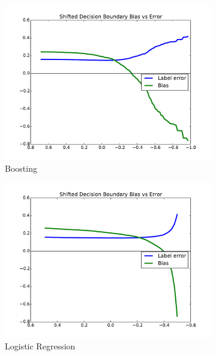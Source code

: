 \documentclass[conference]{IEEEtran}
\begin{document}
\begin{figure}[t]
\centering
\begin{subfigure}{.7\columnwidth}
\includegraphics[width=\columnwidth]{images/adult-boosting-T.pdf}%
\caption{Boosting}%
\label{fig:adult_boosting_tradeoff}%
\end{subfigure}%
\begin{subfigure}{.7\columnwidth}
\includegraphics[width=\columnwidth]{images/adult-lr-T.pdf}%
\caption{Logistic Regression}%
\label{fig:adult_lr_tradeoff}%
\end{subfigure}%
\begin{subfigure}{.7\columnwidth}

\end{subfigure}
\end{figure}
\end{document}
